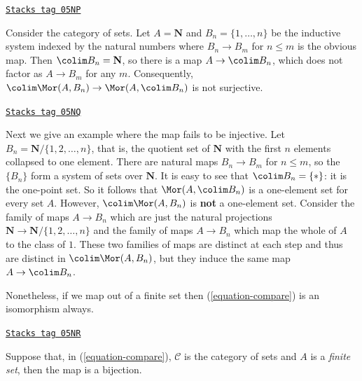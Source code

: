 \begin{example}
\label{injectives-example-not-surjective}
\href{https://stacks.math.columbia.edu/tag/05NP}{\texttt{Stacks tag 05NP}}

Consider the category of sets. Let $A = \mathbf{N}$ and
$B_n = \{1, \ldots, n\}$ be the inductive system indexed by the natural numbers
where $B_n \to B_m$ for $n \leq m$ is the obvious map. Then
$\colim B_n = \mathbf{N}$, so there is a map
$A \to \colim B_n$, which does not factor as $A \to B_m$
for any $m$. Consequently,
$\colim \Mor(A, B_n) \to \Mor(A, \colim B_n)$
is not surjective.
\end{example}

\begin{example}
\label{injectives-example-not-injective}
\href{https://stacks.math.columbia.edu/tag/05NQ}{\texttt{Stacks tag 05NQ}}

Next we give an example where the map fails to be injective. Let $B_n =
\mathbf{N}/\{1,  2, \ldots, n\}$, that is, the quotient set of
$\mathbf{N}$ with the first $n$ elements collapsed to one element.
There are natural maps $B_n \to B_m$ for $n \leq m$, so the
$\{B_n\}$ form a system of sets over $\mathbf{N}$. It is easy to see that
$\colim B_n = \{*\}$: it is the one-point set.
So it follows that $\Mor(A, \colim B_n)$ is a one-element set
for every set $A$.
However, $\colim \Mor(A , B_n)$ is {\bf not} a one-element set.
Consider the family of maps $A \to B_n$ which are just the natural projections
$\mathbf{N} \to \mathbf{N}/\{1, 2, \ldots, n\}$ and the family of
maps $A \to B_n$ which map the whole of $A$ to the class of $1$.
These two families of maps are distinct at each step and thus are distinct in
$\colim \Mor(A, B_n)$, but they induce the same map
$A \to \colim B_n$.
\end{example}

Nonetheless, if we map out of a finite set then
(\ref{equation-compare}) is an isomorphism always.

\begin{lemma}
\label{injectives-lemma-out-of-finite}
\href{https://stacks.math.columbia.edu/tag/05NR}{\texttt{Stacks tag 05NR}}

Suppose that, in (\ref{equation-compare}), $\mathcal{C}$ is the category
of sets and $A$ is a {\it finite set}, then the map is a bijection.
\end{lemma}

